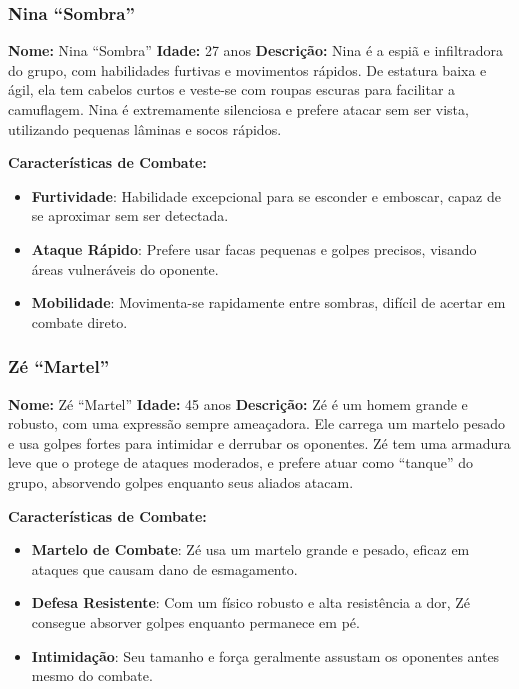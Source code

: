 \begin{personagem}
    

\subsubsection{Nina ``Sombra''}

\textbf{Nome:} Nina ``Sombra''  
\textbf{Idade:} 27 anos  
\textbf{Descrição:}  
Nina é a espiã e infiltradora do grupo, com habilidades furtivas e movimentos rápidos. De estatura baixa e ágil, ela tem cabelos curtos e veste-se com roupas escuras para facilitar a camuflagem. Nina é extremamente silenciosa e prefere atacar sem ser vista, utilizando pequenas lâminas e socos rápidos.

\textbf{Características de Combate:}
\begin{itemize}
    \item \textbf{Furtividade}: Habilidade excepcional para se esconder e emboscar, capaz de se aproximar sem ser detectada.
    \item \textbf{Ataque Rápido}: Prefere usar facas pequenas e golpes precisos, visando áreas vulneráveis do oponente.
    \item \textbf{Mobilidade}: Movimenta-se rapidamente entre sombras, difícil de acertar em combate direto.
\end{itemize}
\end{personagem}
\begin{personagem}
    

\subsubsection{Zé ``Martel''}

\textbf{Nome:} Zé ``Martel''  
\textbf{Idade:} 45 anos  
\textbf{Descrição:}  
Zé é um homem grande e robusto, com uma expressão sempre ameaçadora. Ele carrega um martelo pesado e usa golpes fortes para intimidar e derrubar os oponentes. Zé tem uma armadura leve que o protege de ataques moderados, e prefere atuar como ``tanque'' do grupo, absorvendo golpes enquanto seus aliados atacam.

\textbf{Características de Combate:}
\begin{itemize}
    \item \textbf{Martelo de Combate}: Zé usa um martelo grande e pesado, eficaz em ataques que causam dano de esmagamento.
    \item \textbf{Defesa Resistente}: Com um físico robusto e alta resistência a dor, Zé consegue absorver golpes enquanto permanece em pé.
    \item \textbf{Intimidação}: Seu tamanho e força geralmente assustam os oponentes antes mesmo do combate.
\end{itemize}
\end{personagem}

